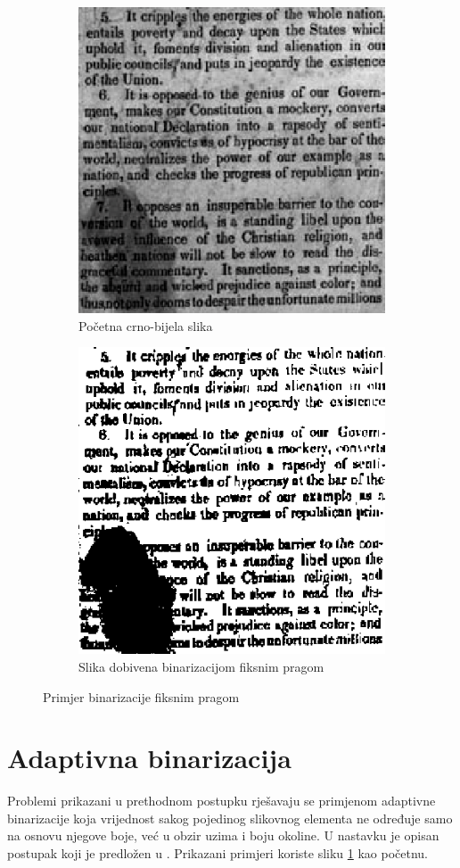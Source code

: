 \documentclass[times, utf8, zavrsni, numeric]{fer}
\begin{document}
\begin{figure}[th!]
    \centering
    \begin{subfigure}{.5\textwidth}
        \centering
        \includegraphics[width=.7\linewidth]{Images/Grayscale.png}
        \caption{Početna crno-bijela slika}
        \label{fig:sub1}
    \end{subfigure}%
    \begin{subfigure}{.5\textwidth}
        \centering
        \includegraphics[width=.7\linewidth]{Images/Threshold.png}
        \caption{Slika dobivena binarizacijom fiksnim pragom}
        \label{fig:sub2}
    \end{subfigure}
    \caption{Primjer binarizacije fiksnim pragom}
    \label{fig:threshold}
\end{figure}

\section{Adaptivna binarizacija}
Problemi prikazani u prethodnom postupku rješavaju se primjenom adaptivne binarizacije koja vrijednost sakog pojedinog slikovnog elementa ne određuje samo na osnovu njegove boje, već u obzir uzima i boju okoline.
U nastavku je opisan postupak koji je predložen u \cite{AdaptiveBinarization}.
Prikazani primjeri koriste sliku \ref{fig:sub1} kao početnu.
\end{document}
